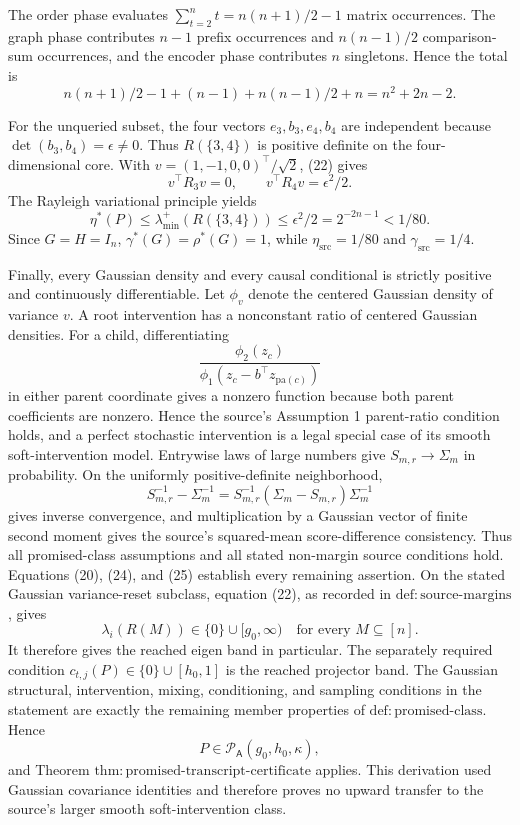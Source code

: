 The order phase evaluates \(\sum_{t=2}^nt=n(n+1)/2-1\) matrix occurrences.  The graph phase contributes \(n-1\) prefix occurrences and \(n(n-1)/2\) comparison-sum occurrences, and the encoder phase contributes \(n\) singletons.  Hence the total is
\[
 n(n+1)/2-1+(n-1)+n(n-1)/2+n=n^2+2n-2.
 \tag{24}
\]

For the unqueried subset, the four vectors \(e_3,b_3,e_4,b_4\) are independent because \(\det(b_3,b_4)=\epsilon\ne0\).  Thus \(R(\{3,4\})\) is positive definite on the four-dimensional core.  With \(v=(1,-1,0,0)^{\top}/\sqrt2\), (22) gives
\[
 v^{\top}R_3v=0,
 \qquad
 v^{\top}R_4v=\epsilon^2/2.
\]
The Rayleigh variational principle yields
\[
 \eta^{\ast}(P)
 \le\lambda_{\min}^{+}(R(\{3,4\}))
 \le\epsilon^2/2=2^{-2n-1}<1/80.
 \tag{25}
\]
Since \(G=H=I_n\), \(\gamma^{\ast}(G)=\rho^{\ast}(G)=1\), while \(\eta_{\mathrm{src}}=1/80\) and \(\gamma_{\mathrm{src}}=1/4\).

Finally, every Gaussian density and every causal conditional is strictly positive and continuously differentiable.  Let \(\phi_v\) denote the centered Gaussian density of variance \(v\).  A root intervention has a nonconstant ratio of centered Gaussian densities.  For a child, differentiating
\[
 \frac{\phi_2(z_c)}{\phi_1(z_c-b^{\top}z_{\mathrm{pa}(c)})}
\]
in either parent coordinate gives a nonzero function because both parent coefficients are nonzero.  Hence the source's Assumption 1 parent-ratio condition holds, and a perfect stochastic intervention is a legal special case of its smooth soft-intervention model.  Entrywise laws of large numbers give \(S_{m,r}\to\Sigma_m\) in probability.  On the uniformly positive-definite neighborhood,
\[
 S_{m,r}^{-1}-\Sigma_m^{-1}
 =S_{m,r}^{-1}(\Sigma_m-S_{m,r})\Sigma_m^{-1}
\]
gives inverse convergence, and multiplication by a Gaussian vector of finite second moment gives the source's squared-mean score-difference consistency.  Thus all promised-class assumptions and all stated non-margin source conditions hold.  Equations (20), (24), and (25) establish every remaining assertion.
On the stated Gaussian variance-reset subclass, equation (22), as recorded in \(\mathrm{def{:}source\mbox{-}margins}\), gives
\[
 \lambda_i(R(M))\in\{0\}\cup[g_0,\infty)
 \quad\text{for every }M\subseteq[n].
 \tag{26}
\]
It therefore gives the reached eigen band in particular.  The separately required condition \(c_{t,j}(P)\in\{0\}\cup[h_0,1]\) is the reached projector band.  The Gaussian structural, intervention, mixing, conditioning, and sampling conditions in the statement are exactly the remaining member properties of \(\mathrm{def{:}promised\mbox{-}class}\).  Hence
\[
 P\in\mathcal P_{\mathsf A}(g_0,h_0,\kappa),
\]
and Theorem \(\mathrm{thm{:}promised\mbox{-}transcript\mbox{-}certificate}\) applies.  This derivation used Gaussian covariance identities and therefore proves no upward transfer to the source's larger smooth soft-intervention class.

